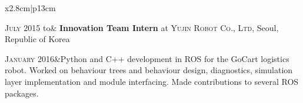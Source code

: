 \documentclass[a4paper,10pt]{article}
\begin{document}
\begin{tabular}{x{2.8cm}|p{13cm}}
\begin{comment}
    In brief, I was to use computer vision and other sensing modalities available to the robot to map dynamic environments, storing information about the nature of the dynamics, and then feed this information to higher and lower level information processing so that it could be used to improve the safety of the overall system. Some of the project partners were using robots developed at Fraunhofer (the care-o-bot series), and so part of my job was to provide software support for the robots.

    I left the position after 4 months due to an environment that I felt was not conducive to me completing a PhD.
  \end{comment}
  \textsc{July 2015} to& \textbf{Innovation Team Intern} at \textsc{Yujin Robot Co., Ltd}, Seoul, Republic of Korea\\
  \begin{comment}
    Part of the team working on development of software for the GoCart delivery robot, designed to operate in nursing homes and other healthcare and hospitality environments. Worked on behaviour trees and behaviour implementation, diagnostics and module interfacing in C++ and Python with ROS. Made some small contributions to the audio_common and diagnostics packages in ROS.
  \end{comment}
  \textsc{January 2016}&\footnotesize{Python and C++ development in ROS for the GoCart logistics robot. Worked on behaviour trees and behaviour design, diagnostics, simulation layer implementation and module interfacing. Made contributions to several ROS packages.}\\
\end{tabular}
\end{document}
